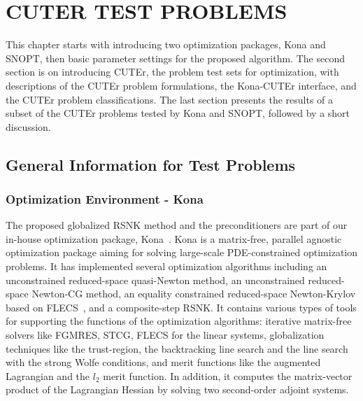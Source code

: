  
\chapter{CUTER TEST PROBLEMS}

This chapter starts with introducing two optimization packages, Kona and SNOPT, then 
basic parameter settings for the proposed algorithm. The second section 
is on introducing CUTEr, the problem test sets for optimization, with descriptions of the 
CUTEr problem formulations,  the Kona-CUTEr interface, and the CUTEr problem classifications. 
The last section presents the results of a subset of the CUTEr problems tested by Kona and SNOPT, 
followed by a short discussion. 


\section{General Information for Test Problems}
\subsection{Optimization Environment - Kona}\label{sec:kona_mv}
The proposed globalized RSNK method and the preconditioners are part of 
our in-house optimization package, Kona~\cite{dener:scitech2016}. Kona is a matrix-free, 
parallel agnostic optimization package aiming for solving large-scale PDE-constrained 
optimization problems.  It has implemented several optimization 
algorithms including an unconstrained 
reduced-space quasi-Newton method, an unconstrained reduced-space 
Newton-CG method, an equality constrained reduced-space Newton-Krylov 
based on FLECS~\cite{hicken:flecs2014}, and a composite-step RSNK.    
It contains various types of tools for supporting the functions of the optimization algorithms:  
iterative matrix-free solvers like FGMRES, STCG, FLECS for the linear systems, 
globalization techniques like the trust-region, the backtracking line search and the line search with 
the strong Wolfe conditions,   and merit functions like the augmented Lagrangian and the $l_2$ 
merit function. In addition, it computes the matrix-vector product of the Lagrangian Hessian 
by solving two second-order adjoint systems. 

